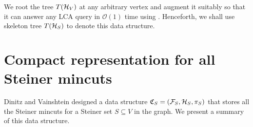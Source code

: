 
We root the tree $T({\cal H}_V)$ at any arbitrary vertex and augment it suitably so that it can answer any LCA query in $\mathcal O(1)$ time using \cite{DBLP:journals/jal/BenderFPSS05}. Henceforth, we shall use skeleton tree $T({\cal H}_S)$ to denote this data structure.



\section{Compact representation for all Steiner mincuts} \label{subsec:connectivity-carcass}

Dinitz and Vainshtein \cite{DBLP:conf/stoc/DinitzV94} designed a data structure $\mathfrak{C}_S = ({\cal F}_S,{\cal H}_S, \pi_S)$ that stores all the Steiner mincuts for a Steiner set $S\subseteq V$ in the graph. We present a summary of this data structure.

